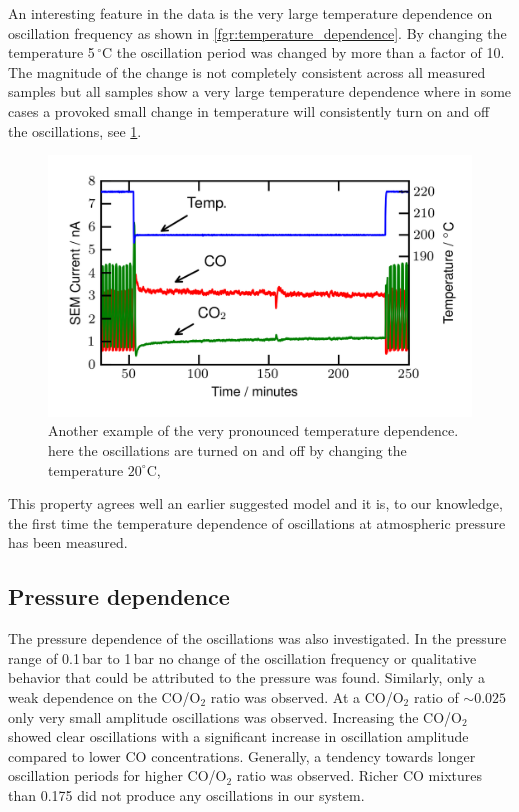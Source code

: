 \documentclass[journal=jacsat,manuscript=article]{achemso}
\begin{document}
An interesting feature in the data is the very large temperature dependence on
oscillation frequency as shown in \ref{fgr:temperature_dependence}. By
changing the temperature 5\,$^\circ$C the oscillation period was changed by more
than a factor of 10. The magnitude of the change is not completely consistent
across all measured samples but all samples show a very large temperature
dependence where in some cases a provoked small change in temperature will
consistently turn on and off the oscillations, see \ref{fgr:temperature_dependence_supplemental}.
\begin{figure}
\centering
  \includegraphics[width=12cm]{temperature_dependence_supplemental.png}
  \caption{Another example of the very pronounced temperature dependence.
  here the oscillations are turned on and off by changing the temperature
  $20^\circ$C,}
  \label{fgr:temperature_dependence_supplemental}
\end{figure}
This property agrees well an earlier suggested model \cite{Hendriksen2010} and
it is, to our knowledge, the first time the temperature dependence of
oscillations at atmospheric pressure has been measured.

\subsection{Pressure dependence}
The pressure dependence of the oscillations was also investigated. In the
pressure range of 0.1\,bar to 1\,bar no change of the oscillation frequency or
qualitative behavior that could be attributed to the pressure was found.
Similarly, only a weak dependence on the CO/O$_2$ ratio was observed. At a
CO/O$_2$ ratio of $\sim0.025$ only very small amplitude oscillations was
observed. Increasing the CO/O$_2$ showed clear oscillations with a significant
increase in oscillation amplitude compared to lower CO concentrations.
Generally, a tendency towards longer oscillation periods for higher CO/O$_2$
ratio was observed. Richer CO mixtures than 0.175 did not produce any
oscillations in our system.
\end{document}
